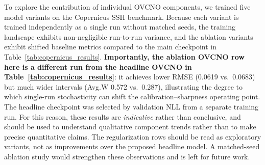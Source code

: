 \documentclass[11pt,a4paper]{article}
\begin{document}
To explore the contribution of individual OVCNO components, we trained five model variants on the Copernicus SSH benchmark. Because each variant is trained independently as a single run without matched seeds, the training landscape exhibits non-negligible run-to-run variance, and the ablation variants exhibit shifted baseline metrics compared to the main checkpoint in Table~\ref{tab:copernicus_results}. \textbf{Importantly, the ablation OVCNO row here is a different run from the headline OVCNO in Table~\ref{tab:copernicus_results}}: it achieves lower RMSE (0.0619 vs.\ 0.0683) but much wider intervals (Avg.W 0.572 vs.\ 0.287), illustrating the degree to which single-run stochasticity can shift the calibration--sharpness operating point. The headline checkpoint was selected by validation NLL from a separate training run. For this reason, these results are \emph{indicative} rather than conclusive, and should be used to understand qualitative component trends rather than to make precise quantitative claims. The regularization rows should be read as exploratory variants, not as improvements over the proposed headline model. A matched-seed ablation study would strengthen these observations and is left for future work.

\begin{table}[!htbp]
\centering
\caption{Component ablation on Copernicus SSH (\textbf{indicative, not conclusive}: each variant is an independent single-run without matched seeds). OVCNO-Geom adds the sensor geometry encoder; OVCNO further adds the learned observability proxy. The last two rows are exploratory regularization variants.}
\label{tab:ovcno_ablation_app}
\vspace{4pt}
\small
{}
\end{table}
\end{document}
